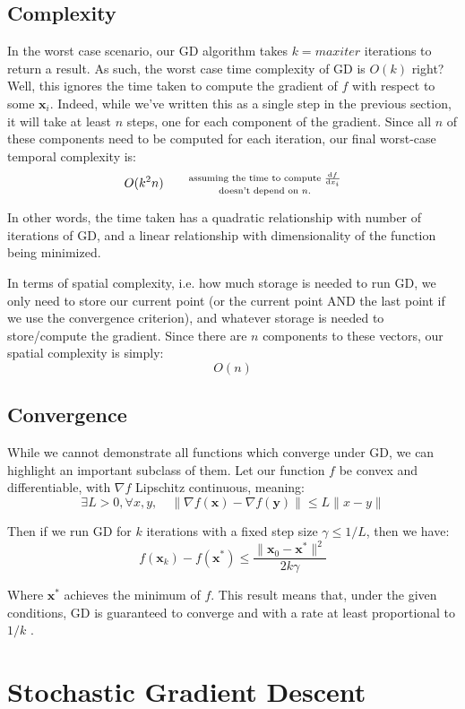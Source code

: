 \documentclass{article}
\renewcommand\vec{\mathbf}
\begin{document}
\subsection*{Complexity}
  In the worst case scenario, our GD algorithm takes $k=maxiter$ iterations to return a result. As such, the worst case time complexity of GD is $O(k)$ right? Well, this ignores the time taken to compute the gradient of $f$ with respect to some $\vec x_i$. Indeed, while we've written this as a single step in the previous section, it will take at least $n$ steps, one for each component of the gradient. Since all $n$ of these components need to be computed for each iteration, our final worst-case temporal complexity is:
  $$O(k^2n)\qquad\substack{\text{assuming the time to compute $\dv{f}{x_i}$}\\\text{doesn't depend on $n$.}}$$

  In other words, the time taken has a quadratic relationship with number of iterations of GD, and a linear relationship with dimensionality of the function being minimized. 

  In terms of spatial complexity, i.e. how much storage is needed to run GD, we only need to store our current point (or the current point AND the last point if we use the convergence criterion), and whatever storage is needed to store/compute the gradient. Since there are $n$ components to these vectors, our spatial complexity is simply:
  $$O(n)$$
  
\subsection*{Convergence}
  While we cannot demonstrate all functions which converge under GD, we can highlight an important subclass of them. Let our function $f$ be convex and differentiable, with $\nabla f$ Lipschitz continuous, meaning:
  $$\exists L>0,\forall x,y,\quad\|\nabla f(\vec x)-\nabla f(\vec y)\|\le L\|x-y\|$$

  Then if we run GD for $k$ iterations with a fixed step size $\gamma\le 1/L$, then we have:
  $$f(\vec x_k)-f(\vec x^*)\le\frac{\|\vec x_0-\vec x^*\|^2}{2k\gamma}$$

  Where $\vec x^*$ achieves the minimum of $f$. This result means that, under the given conditions, GD is guaranteed to converge and with a rate at least proportional to $1/k$ \cite{tibshirani_2013}.

\section*{Stochastic Gradient Descent}
\end{document}
